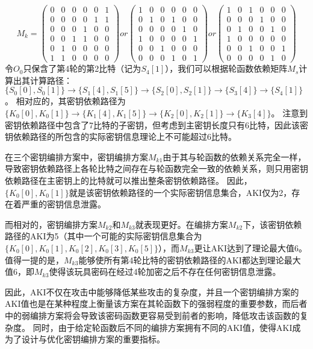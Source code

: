 $$M_k=\left(
    \begin{array}{cccccc}
        0&0&0&0&0&1\\
        0&0&0&0&1&1\\
        0&0&0&1&0&0\\
        0&0&1&1&0&0\\
        0&1&0&0&0&0\\
        1&1&0&0&0&0
    \end{array}
\right)
or\left(
    \begin{array}{cccccc}
        1&0&0&0&0&0\\
        0&1&0&1&0&0\\
        0&0&0&0&1&0\\
        1&0&0&0&0&1\\
        0&0&1&0&0&0\\
        0&0&0&1&0&1
    \end{array}
\right)
or\left(
    \begin{array}{cccccc}
        1&0&1&0&0&0\\
        0&0&0&1&0&0\\
        0&1&0&0&1&0\\
        1&0&0&0&0&0\\
        0&0&1&0&0&1\\
        0&0&0&0&1&0
    \end{array}
\right)$$
令$O_0$只保含了第4轮的第2比特（记为$S_4[1]$），我们可以根据轮函数依赖矩阵$M_s$计算出其计算路径：$\{S_0[0],S_0[1]\}\rightarrow \{S_1[4],S_1[5]\}\rightarrow \{S_2[0],S_2[1]\}\rightarrow \{S_3[4]\}\rightarrow \{S_4[1]\}$。
相对应的，其密钥依赖路径为$\{K_0[0],K_0[1]\}\rightarrow \{K_1[4],K_1[5]\}\rightarrow \{K_2[0],K_2[1]\}\rightarrow \{K_3[4]\}$。
注意到密钥依赖路径中包含了7比特的子密钥，但考虑到主密钥长度只有6比特，因此该密钥依赖路径的所包含的实际密钥信息理论上不可能超过6比特。

在三个密钥编排方案中，密钥编排方案$M_{k1}$由于其与轮函数的依赖关系完全一样，导致密钥依赖路径上各轮比特之间存在与轮函数完全一致的依赖关系，则只用密钥依赖路径在主密钥上的比特就可以推出整条密钥依赖路径。
因此，$\{K_0[0],K_0[1]\}$就是该密钥依赖路径的一个实际密钥信息集合，AKI仅为2，存在着严重的密钥信息泄露。

而相对的，密钥编排方案$M_{k2}$和$M_{k3}$就表现更好。在编排方案$M_{k2}$下，该密钥依赖路径的AKI为5（其中一个可能的实际密钥信息集合为$\{K_0[0],K_0[1],K_0[2],K_0[3],K_0[5]\}$），而$M_{k3}$更让AKI达到了理论最大值6。
值得一提的是，$M_{k3}$能够使所有第4轮比特的密钥依赖路径的AKI都达到理论最大值6，即$M_{k3}$使得该玩具密码在经过4轮加密之后不存在任何密钥信息泄露。

因此，AKI不仅在攻击中能够降低某些攻击的复杂度，并且一个密钥编排方案的AKI值也是在某种程度上衡量该方案在其轮函数下的强弱程度的重要参数，而后者中的弱编排方案将会导致该密码函数更容易受到前者的影响，降低攻击该函数的复杂度。
同时，由于给定轮函数后不同的编排方案拥有不同的AKI值，使得AKI成为了设计与优化密钥编排方案的重要指标。
